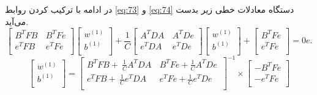  در ادامه با ترکیب کردن روابط \ref{eq:73} و \ref{eq:74} دستگاه معادلات خطی زیر بدست می‌آید.
 \begin{equation}\label{eq:75}
 \left[ \begin{matrix}
 {{B}^{T}}FB\, & {{B}^{T}}Fe  \\
 {{e}^{T}}FB\, & {{e}^{T}}Fe  \\
 \end{matrix} \right]\left[ \begin{matrix}
 {{w}^{\left( 1 \right)}}  \\
 {{b}^{\left( 1 \right)}}  \\
 \end{matrix} \right]+\frac{1}{C}\left[ \begin{matrix}
 {{A}^{T}}DA\, & {{A}^{T}}De  \\
 {{e}^{T}}DA\, & {{e}^{T}}De  \\
 \end{matrix} \right]\left[ \begin{matrix}
 {{w}^{\left( 1 \right)}}  \\
 {{b}^{\left( 1 \right)}}  \\
 \end{matrix} \right] +\left[ \begin{matrix}
 {{B}^{T}}Fe  \\
 {{e}^{T}}Fe  \\
 \end{matrix} \right]=0e.
 \end{equation}
 \begin{equation}\label{eq:76}
 \left[ \begin{matrix}
 {{w}^{\left( 1 \right)}}  \\
 {{b}^{\left( 1 \right)}}  \\
 \end{matrix} \right]={{\left[ \begin{matrix}
 		{{B}^{T}}FB+~\frac{1}{C}{{A}^{T}}DA\, & {{B}^{T}}Fe+\frac{1}{C}{{A}^{T}}De\,  \\
 		{{e}^{T}}FB+~\frac{1}{C}{{e}^{T}}DA\, & {{e}^{T}}Fe+\frac{1}{C}{{e}^{T}}De\,  \\
 		\end{matrix} \right]}^{-1}} \times \left[ \begin{matrix}
 -{{B}^{T}}Fe  \\
 -{{e}^{T}}Fe  \\
 \end{matrix} \right]
 \end{equation}
